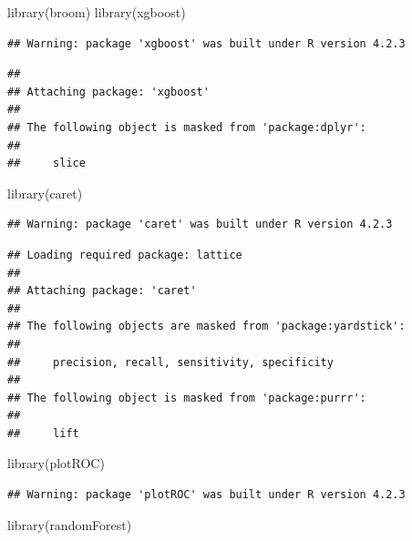 \documentclass[
]{article}
\newenvironment{Shaded}{\begin{snugshade}}{\end{snugshade}}
\newcommand{\FunctionTok}[1]{\textcolor[rgb]{0.00,0.00,0.00}{#1}}
\newcommand{\NormalTok}[1]{#1}
\begin{document}
\begin{Shaded}
\begin{Highlighting}[]
\FunctionTok{library}\NormalTok{(broom)}
\FunctionTok{library}\NormalTok{(xgboost)}
\end{Highlighting}
\end{Shaded}

\begin{verbatim}
## Warning: package 'xgboost' was built under R version 4.2.3
\end{verbatim}

\begin{verbatim}
## 
## Attaching package: 'xgboost'
## 
## The following object is masked from 'package:dplyr':
## 
##     slice
\end{verbatim}

\begin{Shaded}
\begin{Highlighting}[]
\FunctionTok{library}\NormalTok{(caret)}
\end{Highlighting}
\end{Shaded}

\begin{verbatim}
## Warning: package 'caret' was built under R version 4.2.3
\end{verbatim}

\begin{verbatim}
## Loading required package: lattice
## 
## Attaching package: 'caret'
## 
## The following objects are masked from 'package:yardstick':
## 
##     precision, recall, sensitivity, specificity
## 
## The following object is masked from 'package:purrr':
## 
##     lift
\end{verbatim}

\begin{Shaded}
\begin{Highlighting}[]
\FunctionTok{library}\NormalTok{(plotROC)}
\end{Highlighting}
\end{Shaded}

\begin{verbatim}
## Warning: package 'plotROC' was built under R version 4.2.3
\end{verbatim}

\begin{Shaded}
\begin{Highlighting}[]
\FunctionTok{library}\NormalTok{(randomForest)}
\end{Highlighting}
\end{Shaded}
\end{document}
